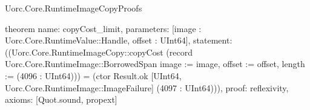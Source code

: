 \begin{lexlean}{Uorc.Core.RuntimeImageCopyProofs}
\begin{semanticmodule}
theorem{
  name: copyCost_limit,
  parameters: [image : Uorc.Core.RuntimeValue::Handle, offset : UInt64],
  statement: ((Uorc.Core.RuntimeImageCopy::copyCost (record Uorc.Core.RuntimeImage::BorrowedSpan {image := image, offset := offset, length := (4096 : UInt64)})) = (ctor Result.ok [UInt64, Uorc.Core.RuntimeImage::ImageFailure] (4097 : UInt64))),
  proof: reflexivity{},
  axioms: [Quot.sound, propext]
}
\end{semanticmodule}
\end{lexlean}
